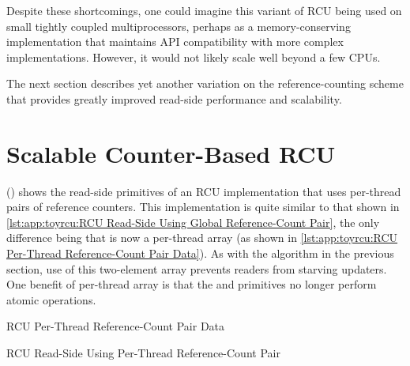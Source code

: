 Despite these shortcomings, one could imagine this variant
of RCU being used on small tightly coupled multiprocessors,
perhaps as a memory-conserving implementation that maintains
API compatibility with more complex implementations.
However, it would not likely scale well beyond a few CPUs.

The next section describes yet another variation on the reference-counting
scheme that provides greatly improved read-side performance and scalability.

\section{Scalable Counter-Based RCU}
\label{sec:app:toyrcu:Scalable Counter-Based RCU}

()
shows the read-side primitives of an RCU implementation that uses per-thread
pairs of reference counters.
This implementation is quite similar to that shown in
\cref{lst:app:toyrcu:RCU Read-Side Using Global Reference-Count Pair},
the only difference being that  is now a per-thread
array (as shown in
\cref{lst:app:toyrcu:RCU Per-Thread Reference-Count Pair Data}).
As with the algorithm in the previous section, use of this two-element
array prevents readers from starving updaters.
One benefit of per-thread  array is that the
 and  primitives no longer
perform atomic operations.

\begin{listing}[tbp]

\caption{RCU Per-Thread Reference-Count Pair Data}
\label{lst:app:toyrcu:RCU Per-Thread Reference-Count Pair Data}
\end{listing}

\begin{listing}[tbp]

\caption{RCU Read-Side Using Per-Thread Reference-Count Pair}
\label{lst:app:toyrcu:RCU Read-Side Using Per-Thread Reference-Count Pair}
\end{listing}

\QuickQuizEnd

